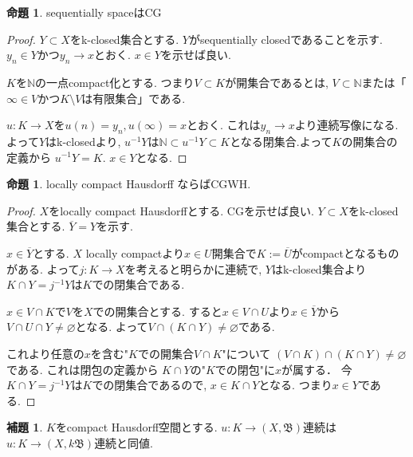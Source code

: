 \documentclass[dvipdfmx,a4paper,11pt]{article}
\newcommand{\N}{\mathbb{N}}
\theoremstyle{definition}
\newtheorem{lem}[thm]{補題}
\newtheorem{prop}[thm]{命題}
\begin{document}
 \begin{tcolorbox}
 [colback = white, colframe = green!35!black, fonttitle = \bfseries,breakable = true]
\begin{prop}\cite[Prop 1.6]{Str}
sequentially spaceはCG
\end{prop}
\end{tcolorbox}
\begin{proof}
$Y \subset X$をk-closed集合とする.
$Y$がsequentially closedであることを示す.
$y_n \in Y$かつ$y_n \to x$とおく. $x \in Y$を示せば良い.

$K$を$\N$の一点compact化とする.
つまり$V \subset K$が開集合であるとは, $V \subset \N$または「$\infty \in V$かつ$K \setminus V$は有限集合」である. 

$u : K \to X$を$u(n)=y_n, u(\infty)=x$とおく. 
これは$y_n \to x$より連続写像になる. 
よって$Y$はk-closedより, $u^{-1}Y$は$\N \subset u^{-1}Y\subset K$となる閉集合.よって$K$の開集合の定義から $u^{-1}Y = K$. $x \in Y$となる. 

\end{proof}

 \begin{tcolorbox}
 [colback = white, colframe = green!35!black, fonttitle = \bfseries,breakable = true]
\begin{prop}\cite[Prop 1.7]{Str}
locally compact Hausdorff ならばCGWH.
\end{prop}
\end{tcolorbox}

\begin{proof}
 $X$をlocally compact Hausdorffとする.
CGを示せば良い. 
$Y \subset X$をk-closed集合とする.
$\overline{Y} = Y$を示す.

$x \in \overline{Y}$とする.
$X$ locally compactより$x \in U$開集合で$K:= \overline{U}$がcompactとなるものがある.
よって$j : K \to X$を考えると明らかに連続で, $Y$はk-closed集合より$K\cap Y = j^{-1}Y$は$K$での閉集合である.

$x \in V \cap K$で$V$を$X$での開集合とする.
すると$x \in V \cap U$より$x \in \overline{Y}$から
$V \cap U \cap Y \neq\varnothing$となる.
よって$V \cap (K \cap Y)\neq\varnothing$である.

これより任意の$x$を含む"$K$での開集合$V \cap K$"について
$(V \cap K) \cap  (K \cap Y) \neq \varnothing$である.
これは閉包の定義から
$K \cap Y$の"$K$での閉包"に$x$が属する．
今$K\cap Y = j^{-1}Y$は$K$での閉集合であるので, $x \in K \cap Y$となる. 
つまり$x \in Y$である. 
\end{proof}

 \begin{tcolorbox}
 [colback = white, colframe = green!35!black, fonttitle = \bfseries,breakable = true]
\begin{lem}\cite[Lemma 1.8]{Str}
$K$をcompact Hausdorff空間とする.
$u : K \to (X,\mathfrak{B})$連続は$u : K \to (X,k\mathfrak{B})$連続と同値.
\end{lem}
\end{tcolorbox}
\end{document}
